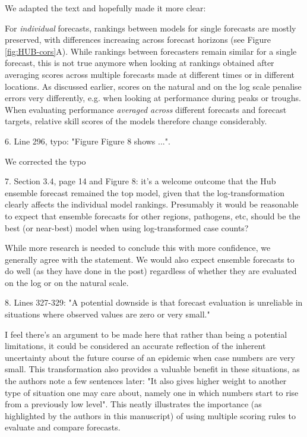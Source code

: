 \documentclass{article}
\newcommand{\black}{\color{black}}
\newcommand{\blue}{\color{blue}}
\begin{document}
\black
We adapted the text and hopefully made it more clear: 

For \textit{individual} forecasts, rankings between models for single forecasts are mostly preserved, with differences increasing across forecast horizons (see Figure \ref{fig:HUB-cors}A). While rankings between forecasters remain similar for a single forecast, this is not true anymore when looking at rankings obtained after averaging scores across multiple forecasts made at different times or in different locations. As discussed earlier, scores on the natural and on the log scale penalise errors very differently, e.g. when looking at performance during peaks or troughs. When evaluating performance \textit{averaged across} different forecasts and forecast targets, relative skill scores of the models therefore change considerably.


\blue
6. Line 296, typo: "Figure Figure 8 shows ...".

\black
We corrected the typo

\blue
7. Section 3.4, page 14 and Figure 8: it's a welcome outcome that the Hub ensemble forecast remained the top model, given that the log-transformation clearly affects the individual model rankings. Presumably it would be reasonable to expect that ensemble forecasts for other regions, pathogens, etc, should be the best (or near-best) model when using log-transformed case counts?

\black
While more research is needed to conclude this with more confidence, we generally agree with the statement. We would also expect ensemble forecasts to do well (as they have done in the post) regardless of whether they are evaluated on the log or on the natural scale. 

\blue
8. Lines 327-329: "A potential downside is that forecast evaluation is unreliable in situations where observed values are zero or very small."

I feel there's an argument to be made here that rather than being a potential limitations, it could be considered an accurate reflection of the inherent uncertainty about the future course of an epidemic when case numbers are very small. This transformation also provides a valuable benefit in these situations, as the authors note a few sentences later: "It also gives higher weight to another type of situation one may care about, namely one in which numbers start to rise from a previously low level". This neatly illustrates the importance (as highlighted by the authors in this manuscript) of using multiple scoring rules to evaluate and compare forecasts.
\end{document}
